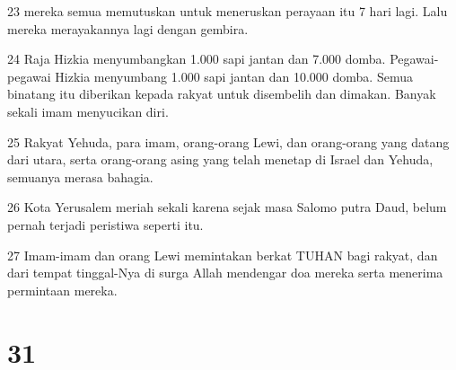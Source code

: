\par 23 mereka semua memutuskan untuk meneruskan perayaan itu 7 hari lagi. Lalu mereka merayakannya lagi dengan gembira.
\par 24 Raja Hizkia menyumbangkan 1.000 sapi jantan dan 7.000 domba. Pegawai-pegawai Hizkia menyumbang 1.000 sapi jantan dan 10.000 domba. Semua binatang itu diberikan kepada rakyat untuk disembelih dan dimakan. Banyak sekali imam menyucikan diri.
\par 25 Rakyat Yehuda, para imam, orang-orang Lewi, dan orang-orang yang datang dari utara, serta orang-orang asing yang telah menetap di Israel dan Yehuda, semuanya merasa bahagia.
\par 26 Kota Yerusalem meriah sekali karena sejak masa Salomo putra Daud, belum pernah terjadi peristiwa seperti itu.
\par 27 Imam-imam dan orang Lewi memintakan berkat TUHAN bagi rakyat, dan dari tempat tinggal-Nya di surga Allah mendengar doa mereka serta menerima permintaan mereka.

\chapter{31}

